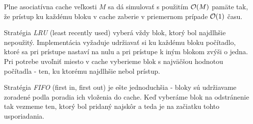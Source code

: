 \begin{lema}
Plne asociatívna cache veľkosti $M$ sa dá simulovať s použitím $\mathcal{O}(M)$ pamäte tak, že prístup ku každému bloku v cache zaberie v priemernom prípade $\mathcal{O}(1)$ času. \citep[Lemma 16]{frigo1999cache}
\end{lema}

Stratégia \emph{LRU} (least recently used) vyberá vždy blok, ktorý bol najdlhšie nepoužitý. Implementácia vyžaduje udržiavať si ku každému bloku počítadlo, ktoré sa pri prístupe nastaví na nulu a pri prístupe k iným blokom zvýši o jedna. Pri potrebe uvoľniť miesto v cache vyberieme blok s najväčšou hodnotou počítadla - ten, ku ktorému najdlhšie nebol prístup.

Stratégia \emph{FIFO} (first in, first out) je ešte jednoduchšia - bloky sú udržiavame zoradené podla poradia ich vloženia do cache. Keď vyberáme blok na odstránenie tak vezmeme ten, ktorý bol pridaný najskôr a teda je na začiatku tohto usporiadania.